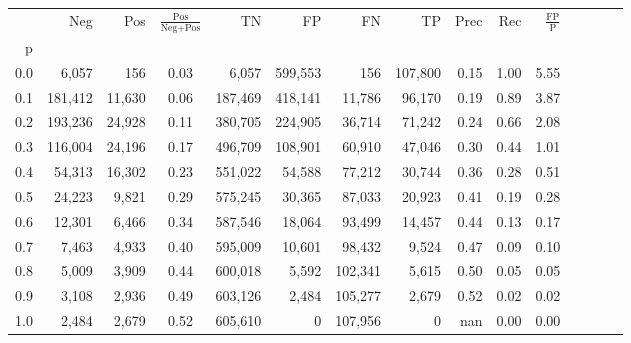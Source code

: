 \begin{tabular}{rrrcrrrrrrrrrrr}
\toprule
{} &      Neg &     Pos & $\frac{\text{Pos}}{\text{Neg}+\text{Pos}}$ &       TN &       FP &       FN &       TP &  Prec &   Rec & $\frac{\text{FP}}{\text{P}}$ \\
p   &          &         &                                            &          &          &          &          &       &       &                              \\
\midrule
0.0 &    6,057 &     156 &                                       0.03 &    6,057 &  599,553 &      156 &  107,800 &  0.15 &  1.00 &                         5.55 \\
0.1 &  181,412 &  11,630 &                                       0.06 &  187,469 &  418,141 &   11,786 &   96,170 &  0.19 &  0.89 &                         3.87 \\
0.2 &  193,236 &  24,928 &                                       0.11 &  380,705 &  224,905 &   36,714 &   71,242 &  0.24 &  0.66 &                         2.08 \\
0.3 &  116,004 &  24,196 &                                       0.17 &  496,709 &  108,901 &   60,910 &   47,046 &  0.30 &  0.44 &                         1.01 \\
0.4 &   54,313 &  16,302 &                                       0.23 &  551,022 &   54,588 &   77,212 &   30,744 &  0.36 &  0.28 &                         0.51 \\
0.5 &   24,223 &   9,821 &                                       0.29 &  575,245 &   30,365 &   87,033 &   20,923 &  0.41 &  0.19 &                         0.28 \\
0.6 &   12,301 &   6,466 &                                       0.34 &  587,546 &   18,064 &   93,499 &   14,457 &  0.44 &  0.13 &                         0.17 \\
0.7 &    7,463 &   4,933 &                                       0.40 &  595,009 &   10,601 &   98,432 &    9,524 &  0.47 &  0.09 &                         0.10 \\
0.8 &    5,009 &   3,909 &                                       0.44 &  600,018 &    5,592 &  102,341 &    5,615 &  0.50 &  0.05 &                         0.05 \\
0.9 &    3,108 &   2,936 &                                       0.49 &  603,126 &    2,484 &  105,277 &    2,679 &  0.52 &  0.02 &                         0.02 \\
1.0 &    2,484 &   2,679 &                                       0.52 &  605,610 &        0 &  107,956 &        0 &   nan &  0.00 &                         0.00 \\
\bottomrule
\end{tabular}
